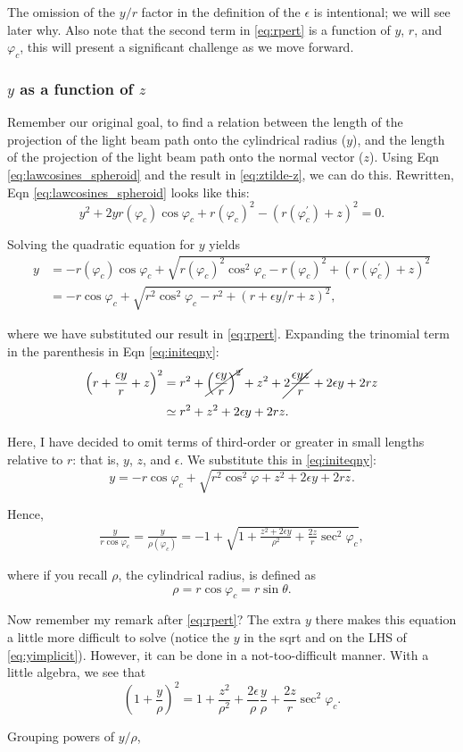 \documentclass[10pt]{article}
\begin{document}
The omission of the $y/r$ factor in the definition of the $\epsilon$ is intentional; we will see later why. Also note that the second term in \eqref{eq:rpert} is a function of $y$, $r$, and $\varphi_c$, this will present a significant challenge as we move forward.

\subsubsection{$y$ as a function of $z$}

Remember our original goal, to find a relation between the length of the projection of the light beam path onto the cylindrical radius ($y$), and the length of the projection of the light beam path onto the normal vector ($z$). Using Eqn \eqref{eq:lawcosines_spheroid} and the result in \eqref{eq:ztilde-z}, we can do this. Rewritten, Eqn \eqref{eq:lawcosines_spheroid} looks like this:
$$
y^2 + 2y r(\varphi_c) \cos \varphi_c + r(\varphi_c)^2 - (r(\varphi_c^{'}) + z)^2 = 0.
$$

Solving the quadratic equation for $y$ yields
\begin{align}
y &= -r(\varphi_c)\cos\varphi_c + \sqrt{r(\varphi_c)^2 \cos^2\varphi_c - r(\varphi_c)^2 + (r(\varphi_c^{'}) + z)^2} \nonumber \\[0.4em] \label{eq:initeqny}
&= -r\cos\varphi_c + \sqrt{r^2 \cos^2\varphi_c - r^2 + (r + \epsilon y/r + z)^2},
\end{align}

where we have substituted our result in \eqref{eq:rpert}. Expanding the trinomial term in the parenthesis in Eqn \eqref{eq:initeqny}:
\begin{align*}
\left(r + \frac{\epsilon y}{r} + z\right)^2 &= r^2 + \cancel{\left(\frac{\epsilon y}{r}\right)^2} + z^2 + \cancel{2\frac{\epsilon yz}{r}} + 2\epsilon y + 2rz \\[0.4em]
&\simeq r^2 + z^2 + 2\epsilon y + 2rz.
\end{align*}

Here, I have decided to omit terms of third-order or greater in small lengths relative to $r$: that is, $y$, $z$, and $\epsilon$. We substitute this in \eqref{eq:initeqny}:
$$
y = -r\cos\varphi_c + \sqrt{r^2 \cos^2\varphi + z^2 + 2\epsilon y + 2rz}.
$$

Hence,
\begin{align} \label{eq:yimplicit}
\frac{y}{r\cos\varphi_c} = \frac{y}{\rho(\varphi_c)} = -1 + \sqrt{1 + \frac{z^2 + 2\epsilon y}{\rho^2} + \frac{2z}{r} \sec^2 \varphi_c},
\end{align}

where if you recall $\rho$, the cylindrical radius, is defined as
$$
\rho = r\cos\varphi_c = r\sin\theta.
$$

Now remember my remark after \eqref{eq:rpert}? The extra $y$ there makes this equation a little more difficult to solve (notice the $y$ in the sqrt and on the LHS of \eqref{eq:yimplicit}). However, it can be done in a not-too-difficult manner. With a little algebra, we see that
$$
\left(1 + \frac{y}{\rho}\right)^2 = 1 + \frac{z^2}{\rho^2} + \frac{2\epsilon}{\rho}\frac{y}{\rho} + \frac{2z}{r}\sec^2 \varphi_c.
$$

Grouping powers of $y/\rho$,
\end{document}
